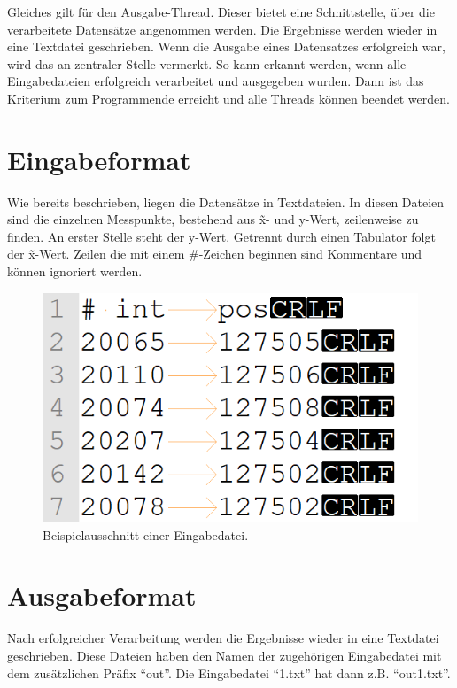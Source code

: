 Gleiches gilt für den Ausgabe-Thread.
Dieser bietet eine Schnittstelle, über die verarbeitete Datensätze angenommen werden.
Die Ergebnisse werden wieder in eine Textdatei geschrieben.
Wenn die Ausgabe eines Datensatzes erfolgreich war, wird das an zentraler Stelle vermerkt.
So kann erkannt werden, wenn alle Eingabedateien erfolgreich verarbeitet und ausgegeben wurden.
Dann ist das Kriterium zum Programmende erreicht und alle Threads können beendet werden.

\section{Eingabeformat}\label{sec:eingabe-format}
Wie bereits beschrieben, liegen die Datensätze in Textdateien.
In diesen Dateien sind die einzelnen Messpunkte, bestehend aus \~x- und y-Wert, zeilenweise zu finden.
An erster Stelle steht der y-Wert.
Getrennt durch einen Tabulator folgt der \~x-Wert.
Zeilen die mit einem \#-Zeichen beginnen sind Kommentare und können ignoriert werden.
\begin{figure}[htb]
    \centering
    \includegraphics[width=0.5\linewidth]{images/eingabeDat_bsp}
    \caption{
        Beispielausschnitt einer Eingabedatei.
    }
    \label{fig:eingabe_dat_beispiel}
\end{figure}


\section{Ausgabeformat}\label{sec:ausgabeformat}
Nach erfolgreicher Verarbeitung werden die Ergebnisse wieder in eine Textdatei geschrieben.
Diese Dateien haben den Namen der zugehörigen Eingabedatei mit dem zusätzlichen Präfix \enquote{out}.
Die Eingabedatei \enquote{1.txt} hat dann z.B. \enquote{out1.txt}.

